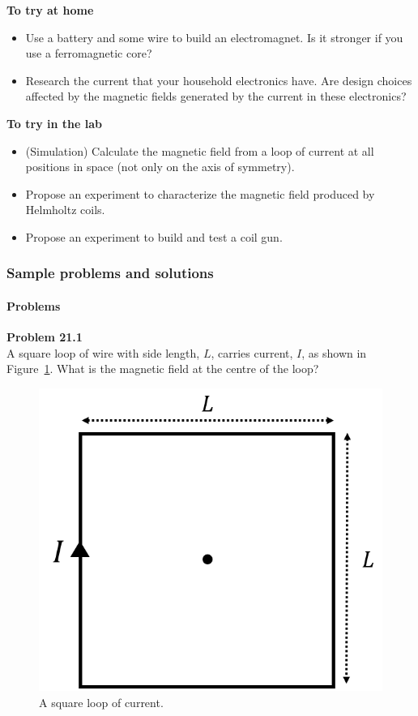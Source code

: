 \begin{framed}
\textbf{To try at home}\\
\begin{itemize}
\item Use a battery and some wire to build an electromagnet. Is it stronger if you use a ferromagnetic core?
\item Research the current that your household electronics have. Are design choices affected by the magnetic fields generated by the current in these electronics?
\end{itemize}
\end{framed}

\begin{framed}
\textbf{To try in the lab}\\
\begin{itemize}
\item (Simulation) Calculate the magnetic field from a loop of current at all positions in space (not only on the axis of symmetry).
\item Propose an experiment to characterize the magnetic field produced by Helmholtz coils.
\item Propose an experiment to build and test a coil gun.
\end{itemize}
\end{framed}

\subsubsection{Sample problems and solutions}

\paragraph{Problems}

\begin{framed}
\textbf{Problem 21.1}\\
A square loop of wire with side length, $L$, carries current, $I$, as shown in Figure~\ref{fig:magneticsource:squareloop}. What is the magnetic field at the centre of the loop?

\begin{figure}[!htbp]
\centering
\includegraphics[width=0.3\linewidth]{files/squareloop-b9f08214664e39de556569ccfa71efa9.png}
\caption[]{A square loop of current.}
\label{fig:magneticsource:squareloop}
\end{figure}
\end{framed}

